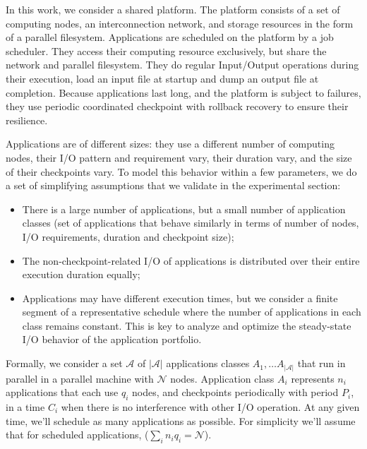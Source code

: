 \documentclass{article}
\newcommand{\appset}{{\mathcal A}}
\newcommand{\nbnodesplat}{{\mathcal N}}
\newcommand{\nbapps}{|{\mathcal A}|}
\newcommand{\app}[1]{A_{#1}}
\newcommand{\nbapp}[1]{n_{#1}}
\newcommand{\nbnodes}[1]{q_{#1}}
\newcommand{\period}[1]{P_{#1}}
\newcommand{\ckpt}[1]{C_{#1}}
\begin{document}
In this work, we consider a shared platform. The platform consists of
a set of computing nodes, an interconnection network, and storage
resources in the form of a parallel filesystem. Applications are
scheduled on the platform by a job scheduler. They access their
computing resource exclusively, but share the network and parallel
filesystem. They do regular Input/Output operations during their
execution, load an input file at startup and dump an output file at
completion. Because applications last long, and the platform is
subject to failures, they use periodic coordinated checkpoint with
rollback recovery to ensure their resilience.

Applications are of different sizes: they use a different number of
computing nodes, their I/O pattern and requirement vary, their
duration vary, and the size of their checkpoints vary. To model this
behavior within a few parameters, we do a set of simplifying assumptions
that we validate in the experimental section:
\begin{itemize}
  \item There is a large number of applications, but a small number of
    application classes (set of applications that behave similarly in
    terms of number of nodes, I/O requirements, duration and
    checkpoint size);
  \item The non-checkpoint-related I/O of applications is distributed
    over their entire execution duration equally;
  \item Applications may have different execution times, but we consider a finite
    segment of a representative schedule where the number of applications in each class remains constant. This is key to analyze and optimize the steady-state I/O behavior of the 
    application portfolio. 
\end{itemize}

Formally, we consider a set $\appset$ of $\nbapps$ applications
classes $\app{1}, \ldots \app{\nbapps}$ that run in parallel in a
parallel machine with $\nbnodesplat$ nodes. Application class
$\app{i}$ represents $\nbapp{i}$ applications that each use
$\nbnodes{i}$ nodes, and checkpoints
periodically with period $\period{i}$, in a time $\ckpt{i}$ when there
is no interference with other I/O operation. At any given time, we'll schedule as many applications as possible. For simplicity we'll assume that for scheduled applications, ($\sum_{i}\nbapp{i} \nbnodes{i} = \nbnodesplat$). 
\end{document}
